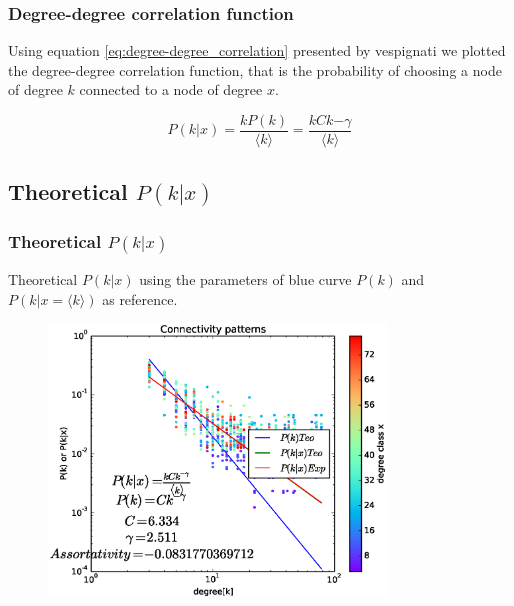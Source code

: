 \documentclass{beamer}
\begin{document}
\begin{frame}\frametitle{Degree-degree correlation function}


Using equation \ref{eq:degree-degree_correlation} presented by vespignati we plotted the degree-degree correlation function, that is the probability of choosing a node of degree $k$ connected to a node of degree $x$.


\begin{equation}
\label{eq:degree-degree_correlation}
P(k|x)=\frac{kP(k)}{\langle k \rangle}=\frac{kCk{-\gamma}}{\langle k \rangle}
\end{equation}

\end{frame}
	

\subsection{Theoretical $P(k|x)$}


\begin{frame}\frametitle{Theoretical $P(k|x)$}
Theoretical $P(k|x)$ using the parameters of blue curve $P(k)$ and $P(k|x=\langle k \rangle)$ as reference.

\begin{figure}[hbt!]
\includegraphics[width=0.8\textwidth]{./temp/exp/results/Image03.eps}

\end{figure}
\end{frame}
	
\end{document}
